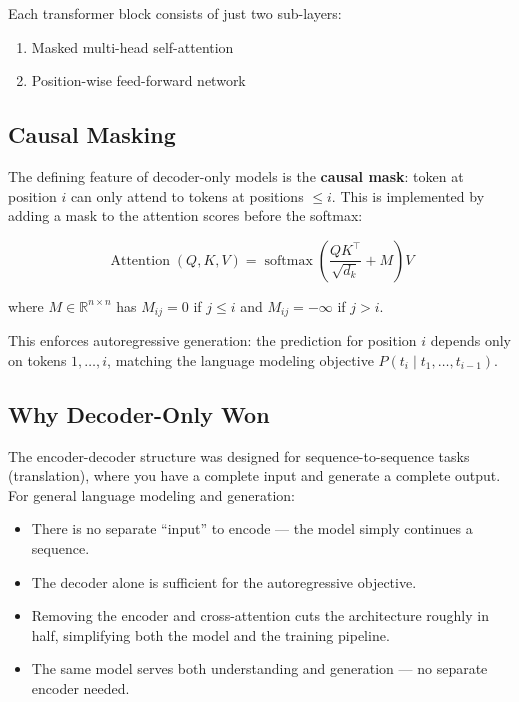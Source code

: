 \documentclass[11pt,a4paper]{article}
\newcommand{\R}{\mathbb{R}}
\newcommand{\softmax}{\operatorname{softmax}}
\newcommand{\Attention}{\operatorname{Attention}}
\newcommand{\dk}{d_k}
\begin{document}
Each transformer block consists of just two sub-layers:
\begin{enumerate}[nosep]
  \item Masked multi-head self-attention
  \item Position-wise feed-forward network
\end{enumerate}

\subsection{Causal Masking}

The defining feature of decoder-only models is the \textbf{causal mask}: token at position
$i$ can only attend to tokens at positions $\leq i$. This is implemented by adding a mask
to the attention scores before the softmax:

\begin{equation}
  \Attention(Q, K, V) = \softmax\!\left(\frac{QK^\top}{\sqrt{\dk}} + M \right) V
\end{equation}

where $M \in \R^{n \times n}$ has $M_{ij} = 0$ if $j \leq i$ and $M_{ij} = -\infty$
if $j > i$.

This enforces autoregressive generation: the prediction for position $i$ depends only on
tokens $1, \ldots, i$, matching the language modeling objective
$P(t_i \mid t_1, \ldots, t_{i-1})$.

\subsection{Why Decoder-Only Won}

The encoder-decoder structure was designed for sequence-to-sequence tasks (translation),
where you have a complete input and generate a complete output. For general language
modeling and generation:

\begin{itemize}[nosep]
  \item There is no separate ``input'' to encode --- the model simply continues a sequence.
  \item The decoder alone is sufficient for the autoregressive objective.
  \item Removing the encoder and cross-attention cuts the architecture roughly in half,
    simplifying both the model and the training pipeline.
  \item The same model serves both understanding and generation --- no separate encoder
    needed.
\end{itemize}
\end{document}
